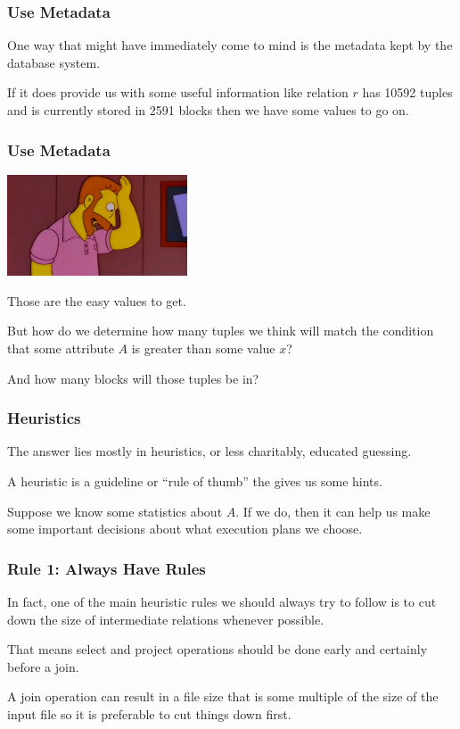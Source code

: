 \begin{frame}
\frametitle{Use Metadata}

One way that might have immediately come to mind is the metadata kept by the database system. 

If it does provide us with some useful information like relation $r$ has 10592 tuples and is currently stored in 2591 blocks then we have some values to go on. 

\end{frame}


\begin{frame}
\frametitle{Use Metadata}

\begin{center}
	\includegraphics[width=0.4\textwidth]{images/scorpio.jpg}
\end{center}

Those are the easy values to get. 

But how do we determine how many tuples we think will match the condition that some attribute $A$ is greater than some value $x$? 

And how many blocks will those tuples be in?


\end{frame}

\begin{frame}
\frametitle{Heuristics}
The answer lies mostly in \alert{heuristics}, or less charitably, educated guessing. 

A heuristic is a guideline or ``rule of thumb'' the gives us some hints. 

Suppose we know some statistics about $A$. If we do, then it can help us make some important decisions about what execution plans we choose. 


\end{frame}


\begin{frame}
\frametitle{Rule 1: Always Have Rules}
In fact, one of the main heuristic rules we should always try to follow is to cut down the size of intermediate relations whenever possible. 

That means select and project operations should be done early and certainly before a join. 

A join operation can result in a file size that is some multiple of the size of the input file so it is preferable to cut things down first.


\end{frame}


